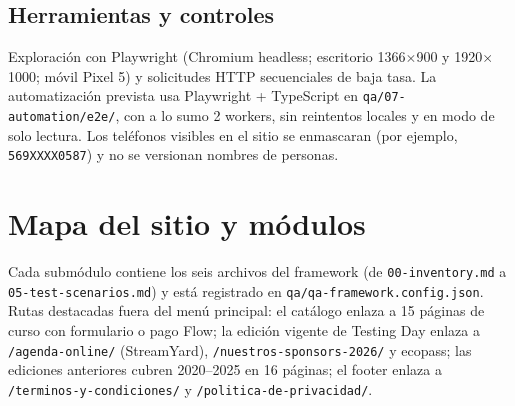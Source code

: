 \documentclass[11pt,a4paper]{article}
\newcommand{\code}[1]{\texttt{#1}}
\newcommand{\upath}[1]{\nolinkurl{#1}}
\begin{document}
\subsection{Herramientas y controles}
Exploración con Playwright (Chromium headless; escritorio 1366$\times$900 y 1920$\times$1000;
móvil Pixel 5) y solicitudes HTTP secuenciales de baja tasa. La automatización prevista usa
Playwright + TypeScript en \code{qa/07-automation/e2e/}, con a lo sumo 2 workers, sin
reintentos locales y en modo de solo lectura. Los teléfonos visibles en el sitio se
enmascaran (por ejemplo, \code{569XXXX0587}) y no se versionan nombres de personas.

\section{Mapa del sitio y módulos}

{\raggedright
Cada submódulo contiene los seis archivos del framework (de \upath{00-inventory.md} a \upath{05-test-scenarios.md}) y está registrado en \upath{qa/qa-framework.config.json}.
Rutas destacadas fuera del menú principal: el catálogo enlaza a 15 páginas de curso con
formulario o pago Flow; la edición vigente de Testing Day enlaza a \upath{/agenda-online/}
(StreamYard), \upath{/nuestros-sponsors-2026/} y ecopass; las ediciones anteriores cubren
2020--2025 en 16 páginas; el footer enlaza a \upath{/terminos-y-condiciones/} y
\upath{/politica-de-privacidad/}.\par}
\end{document}
